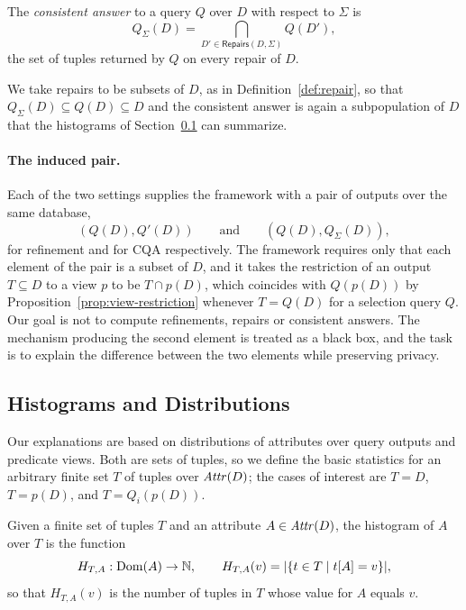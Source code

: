 \begin{definition}
\label{def:consistent-answer}
The \emph{consistent answer} to a query $Q$ over $D$ with respect to $\Sigma$ is
\[
Q_\Sigma(D)=\bigcap_{D'\in \mathsf{Repairs}(D,\Sigma)} Q(D') ,
\]
the set of tuples returned by $Q$ on every repair of $D$.
\end{definition}

We take repairs to be subsets of $D$, as in Definition~\ref{def:repair}, so that
$Q_\Sigma(D)\subseteq Q(D)\subseteq D$ and the consistent answer is again a
subpopulation of $D$ that the histograms of
Section~\ref{subsec:prelim-histograms} can summarize.

\paragraph{The induced pair.}
Each of the two settings supplies the framework with a pair of outputs over the
same database,
\[
(Q(D),Q'(D))
\qquad\text{and}\qquad
(Q(D),Q_\Sigma(D)) ,
\]
for refinement and for CQA respectively.
The framework requires only that each element of the pair is
a subset of $D$, and it takes the restriction of an output $T\subseteq D$ to a view
$p$ to be $T\cap p(D)$, which coincides with $Q(p(D))$ by
Proposition~\ref{prop:view-restriction} whenever $T=Q(D)$ for a selection query
$Q$. Our goal is not to compute refinements, repairs or consistent answers. The
mechanism producing the second element is treated as a black box, and the task is
to explain the difference between the two elements while preserving privacy.

\subsection{Histograms and Distributions}
\label{subsec:prelim-histograms}

Our explanations are based on distributions of attributes over query outputs and
predicate views.
Both are sets of tuples, so we define the basic statistics for an arbitrary finite
set $T$ of tuples over $\mathit{Attr}(D)$; the cases of interest are $T=D$, $T=p(D)$, and
$T=Q_i(p(D))$.

\begin{definition}[Histogram]
\label{def:histogram}
Given a finite set of tuples $T$ and an attribute $A \in \mathit{Attr}(D)$, the
histogram of $A$ over $T$ is the function
\[
H_{T,A}: \operatorname{Dom}(A)\rightarrow \mathbb{N},
\qquad
H_{T,A}(v) = |\{t\in T \mid t[A]=v\}| ,
\]
so that $H_{T,A}(v)$ is the number of tuples in $T$ whose value for $A$ equals $v$.
\end{definition}

